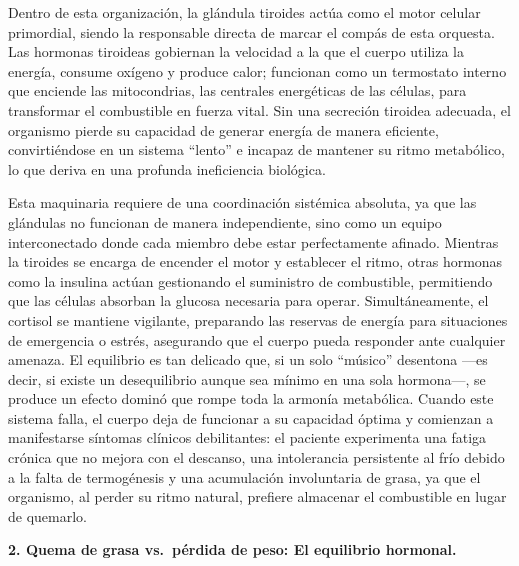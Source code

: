 \documentclass[
  spanish,
]{article}
\begin{document}
Dentro de esta organización, la glándula tiroides actúa como el motor celular primordial, siendo la responsable directa de marcar el compás de esta orquesta. Las hormonas tiroideas gobiernan la velocidad a la que el cuerpo utiliza la energía, consume oxígeno y produce calor; funcionan como un termostato interno que enciende las mitocondrias, las centrales energéticas de las células, para transformar el combustible en fuerza vital. Sin una secreción tiroidea adecuada, el organismo pierde su capacidad de generar energía de manera eficiente, convirtiéndose en un sistema ``lento'' e incapaz de mantener su ritmo metabólico, lo que deriva en una profunda ineficiencia biológica.

Esta maquinaria requiere de una coordinación sistémica absoluta, ya que las glándulas no funcionan de manera independiente, sino como un equipo interconectado donde cada miembro debe estar perfectamente afinado. Mientras la tiroides se encarga de encender el motor y establecer el ritmo, otras hormonas como la insulina actúan gestionando el suministro de combustible, permitiendo que las células absorban la glucosa necesaria para operar. Simultáneamente, el cortisol se mantiene vigilante, preparando las reservas de energía para situaciones de emergencia o estrés, asegurando que el cuerpo pueda responder ante cualquier amenaza.
El equilibrio es tan delicado que, si un solo ``músico'' desentona ---es decir, si existe un desequilibrio aunque sea mínimo en una sola hormona---, se produce un efecto dominó que rompe toda la armonía metabólica. Cuando este sistema falla, el cuerpo deja de funcionar a su capacidad óptima y comienzan a manifestarse síntomas clínicos debilitantes: el paciente experimenta una fatiga crónica que no mejora con el descanso, una intolerancia persistente al frío debido a la falta de termogénesis y una acumulación involuntaria de grasa, ya que el organismo, al perder su ritmo natural, prefiere almacenar el combustible en lugar de quemarlo.

\textbf{2. Quema de grasa vs.~pérdida de peso: El equilibrio hormonal.}
\end{document}
